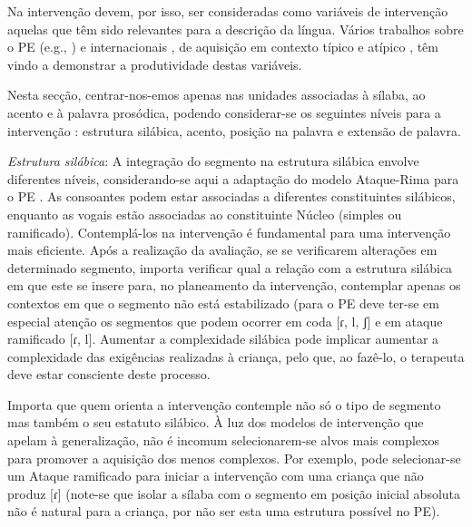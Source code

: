 \documentclass[output=paper,colorlinks,citecolor=brown,booklanguage=portuguese]{langscibook}
\begin{document}
Na intervenção devem, por isso, ser consideradas como variáveis de intervenção aquelas que têm sido relevantes para a descrição da língua. Vários trabalhos sobre o PE (e.g., \citealp{Freitas1997, Amorim2014, Ramalho2017}) e internacionais \citep{Bernhardt2020}, de aquisição em contexto típico e atípico \citep{Lousada2012, Baptista2015, Ramalho2017a}, têm vindo a demonstrar a produtividade destas variáveis.

Nesta secção, centrar-nos-emos apenas nas unidades associadas à sílaba, ao acento e à palavra prosódica, podendo considerar-se os seguintes níveis para a intervenção \citep{Bernhardt2000}: estrutura silábica, acento, posição na palavra e extensão de palavra.

\emph{Estrutura silábica}: A integração do segmento na estrutura silábica envolve dife\-rentes níveis, considerando-se aqui a adaptação do modelo Ataque-Rima para o PE \citep{Freitas2017}. As consoantes podem estar associadas a diferentes constituintes silábicos, enquanto as vogais estão associadas ao constituinte Núcleo (simples ou ramificado). Contemplá-los na intervenção é fundamental para uma intervenção mais eficiente. Após a realização da avaliação, se se verificarem alterações em determinado segmento, importa verificar qual a relação com a estrutura silábica em que este se insere para, no planeamento da intervenção, contemplar apenas os contextos em que o segmento não está estabilizado (para o PE deve ter-se em especial atenção os segmentos que podem ocorrer em coda [ɾ, l, ʃ] e em ataque ramificado [ɾ, l]. Aumentar a complexidade silábica pode implicar aumentar a complexidade das exigências realizadas à criança, pelo que, ao fazê-lo, o terapeuta deve estar consciente deste processo.

Importa que quem orienta a intervenção contemple não só o tipo de segmento mas também o seu estatuto silábico. À luz dos modelos de intervenção que apelam à generalização, não é incomum selecionarem-se alvos mais complexos para promover a aquisição dos menos complexos. Por exemplo, pode selecionar-se um Ataque ramificado para iniciar a intervenção com uma criança que não produz [ɾ] (note-se que isolar a sílaba com o segmento em posição inicial absoluta não é natural para a criança, por não ser esta uma estrutura possível no PE).
\end{document}
